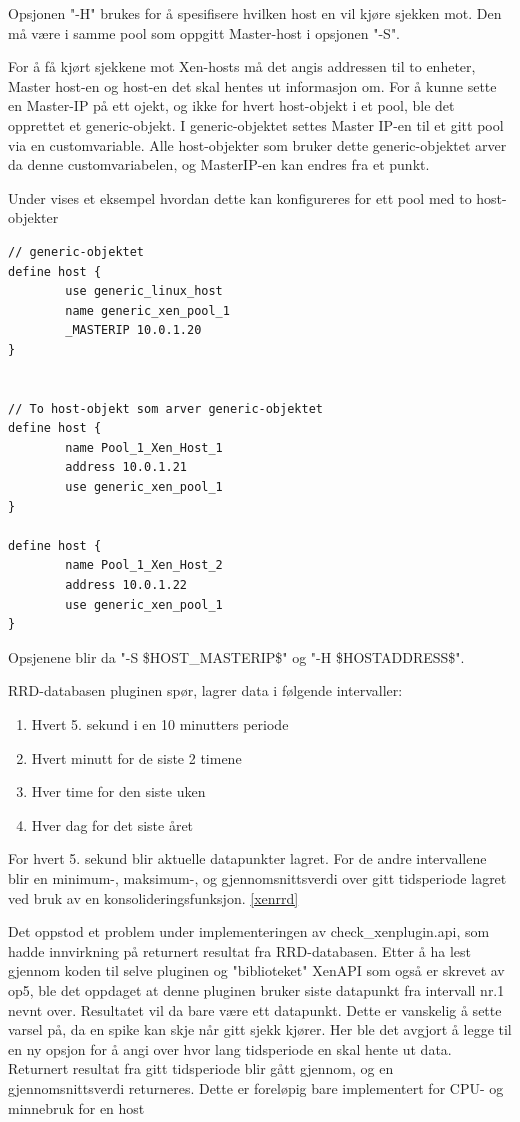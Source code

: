 Opsjonen "-H"  brukes for å spesifisere hvilken host en vil kjøre sjekken mot. Den må være i samme pool som oppgitt Master-host i opsjonen "-S".

For å få kjørt sjekkene mot Xen-hosts må det angis addressen til to enheter, Master host-en og host-en det skal hentes ut informasjon om. For å kunne sette en Master-IP på ett ojekt, og ikke for hvert host-objekt i et pool, ble det opprettet et generic-objekt. I generic-objektet settes Master IP-en til et gitt pool via en customvariable. Alle host-objekter som bruker dette generic-objektet arver da denne customvariabelen, og MasterIP-en kan endres fra et punkt.

Under vises et eksempel hvordan dette kan konfigureres for ett pool med to host-objekter

\begin{lstlisting}[style=example]
// generic-objektet
define host {
        use generic_linux_host
        name generic_xen_pool_1
        _MASTERIP 10.0.1.20
}


// To host-objekt som arver generic-objektet
define host {
        name Pool_1_Xen_Host_1
        address 10.0.1.21
        use generic_xen_pool_1
}

define host {
        name Pool_1_Xen_Host_2
        address 10.0.1.22
        use generic_xen_pool_1
}
\end{lstlisting}

Opsjenene blir da "-S \$HOST\_MASTERIP\$" og "-H \$HOSTADDRESS\$".

RRD-databasen pluginen spør, lagrer data i følgende intervaller:

\begin{enumerate}
        \item Hvert 5. sekund i en 10 minutters periode
        \item Hvert minutt for de siste 2 timene
	\item Hver time for den siste uken
        \item Hver dag for det siste året
\end{enumerate}

For hvert 5. sekund blir aktuelle datapunkter lagret. For de andre intervallene blir en minimum-, maksimum-, og gjennomsnittsverdi over gitt tidsperiode lagret ved bruk av en konsolideringsfunksjon. \ref{xenrrd}

Det oppstod et problem under implementeringen av check\_xenplugin.api, som hadde innvirkning på returnert resultat fra RRD-databasen. Etter å ha lest gjennom koden til selve pluginen og "biblioteket"  XenAPI som også er skrevet av op5, ble det oppdaget at denne pluginen bruker siste datapunkt fra intervall nr.1 nevnt over. Resultatet vil da bare være ett datapunkt. Dette er vanskelig å sette varsel på, da en spike kan skje når gitt sjekk kjører. Her ble det avgjort å legge til en ny opsjon for å angi over hvor lang tidsperiode en skal hente ut data. Returnert resultat fra gitt tidsperiode blir gått gjennom, og en gjennomsnittsverdi returneres. Dette er foreløpig bare implementert for CPU- og minnebruk for en host

